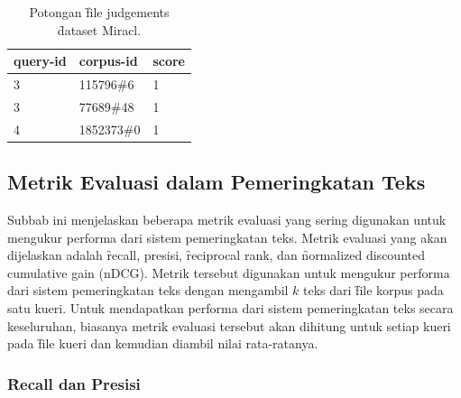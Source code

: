     \begin{table}
        \centering
        \caption{Potongan \f{file} judgements \f{dataset} Miracl.}
        \label{tab:judgements-file-example}
        \begin{tabular}{|l|l|l|}
            \hline
            \textbf{query-id} & \textbf{corpus-id} & \textbf{score} \\ \hline
            3                 & 115796\#6          & 1              \\ \hline
            3                 & 77689\#48          & 1              \\ \hline
            4                 & 1852373\#0         & 1              \\ \hline
        \end{tabular}
    \end{table}
    


    \subsection{Metrik Evaluasi dalam Pemeringkatan Teks}
    \label{sec:metrik-evaluasi}
    Subbab ini menjelaskan beberapa metrik evaluasi yang sering digunakan untuk mengukur performa dari sistem pemeringkatan teks. Metrik evaluasi yang akan dijelaskan adalah \f{recall}, presisi, \f{reciprocal rank}, dan \f{normalized discounted cumulative gain} (nDCG). Metrik tersebut digunakan untuk mengukur performa dari sistem pemeringkatan teks dengan mengambil $k$ teks dari \f{file} korpus pada satu kueri. Untuk mendapatkan performa dari sistem pemeringkatan teks secara keseluruhan, biasanya metrik evaluasi tersebut akan dihitung untuk setiap kueri pada \f{file} kueri dan kemudian diambil nilai rata-ratanya.

    \subsubsection{\f{Recall} dan Presisi}

